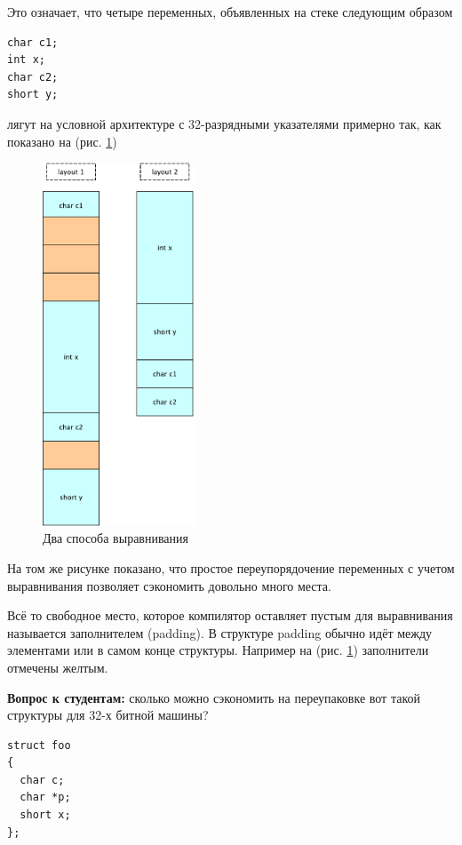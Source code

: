 \documentclass[a4paper,12pt,oneside]{article}
\begin{document}
Это означает, что четыре переменных, объявленных на стеке следующим образом

\begin{lstlisting}
char c1;
int x;
char c2;
short y;
\end{lstlisting}

лягут на условной архитектуре с 32-разрядными указателями примерно так, как показано на (рис. \ref{fig:alignment})

\begin{figure}[h!]
\centering
\includegraphics[width=0.4\textwidth]{illustrations/alignment-crop.pdf}
\caption{Два способа выравнивания}
\label{fig:alignment}
\end{figure}

На том же рисунке показано, что простое переупорядочение переменных с учетом выравнивания позволяет сэкономить довольно много места.

Всё то свободное место, которое компилятор оставляет пустым для выравнивания называется заполнителем (padding). В структуре padding обычно идёт между элементами или в самом конце структуры. Например на (рис. \ref{fig:alignment}) заполнители отмечены желтым.

\textbf{Вопрос к студентам:} сколько можно сэкономить на переупаковке вот такой структуры для 32-х битной машины?

\begin{lstlisting}
struct foo
{
  char c;
  char *p;
  short x;
};
\end{lstlisting}
\end{document}
